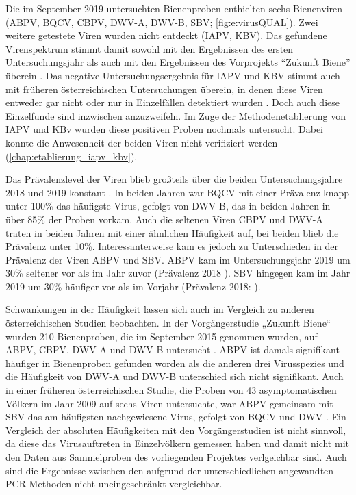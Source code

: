 Die im September 2019 untersuchten Bienenproben enthielten sechs Bienenviren (ABPV, BQCV, CBPV, DWV-A, DWV-B, SBV; \cref{fig:e:virusQUAL}). Zwei weitere getestete Viren wurden nicht entdeckt (IAPV, KBV). Das gefundene Virenspektrum stimmt damit sowohl mit den Ergebnissen des ersten Untersuchungsjahr als auch mit den Ergebnissen des Vorprojekts \enquote{Zukunft Biene} überein \citep{brodschneider2018b,brodschneider2019b}. Das negative Untersuchungsergebnis für IAPV und KBV stimmt auch mit früheren österreichischen Untersuchungen überein, in denen diese Viren entweder gar nicht oder nur in Einzelfällen detektiert wurden \citep{köglberger2009,girsch2012,moosbeckhofer2014}. Doch auch diese Einzelfunde sind inzwischen anzuzweifeln. Im Zuge der Methodenetablierung von IAPV und KBv wurden diese positiven Proben nochmals untersucht. Dabei konnte die Anwesenheit der beiden Viren nicht verifiziert werden (\cref{chap:etablierung_iapv_kbv}).

Das Prävalenzlevel der Viren blieb großteils über die beiden Untersuchungsjahre 2018 und 2019 konstant \citep{brodschneider2019b,morawetz2019a}. In beiden Jahren war BQCV mit einer Prävalenz knapp unter 100\% das häufigste Virus, gefolgt von DWV-B, das in beiden Jahren in über 85\% der Proben vorkam. Auch die seltenen Viren CBPV und DWV-A traten in beiden Jahren mit einer ähnlichen Häufigkeit auf, bei beiden blieb die Prävalenz unter 10\%. Interessanterweise kam es jedoch zu Unterschieden in der Prävalenz der Viren ABPV und SBV. ABPV kam im Untersuchungsjahr 2019 um 30\% seltener vor als im Jahr zuvor (Prävalenz 2018 ). SBV hingegen kam im Jahr 2019 um 30\% häufiger vor als im Vorjahr (Prävalenz 2018: ).

Schwankungen in der Häufigkeit lassen sich auch im Vergleich zu anderen österreichischen Studien beobachten. In der Vorgängerstudie „Zukunft Biene“ wurden 210 Bienenproben, die im September 2015 genommen wurden, auf ABPV, CBPV, DWV-A und DWV-B untersucht \citep{morawetz2018}. ABPV ist damals signifikant häufiger in Bienenproben gefunden worden als die anderen drei Virusspezies und die Häufigkeit von DWV-A und DWV-B unterschied sich nicht signifikant. Auch in einer früheren österreichischen Studie, die Proben von 43 asymptomatischen Völkern im Jahr 2009 auf sechs Viren untersuchte, war ABPV gemeinsam mit SBV das am häufigsten nachgewiesene Virus, gefolgt von BQCV und DWV \citep{köglberger2009}.  Ein Vergleich der absoluten Häufigkeiten mit den Vorgängerstudien ist nicht sinnvoll, da diese das Virusauftreten in Einzelvölkern gemessen haben und damit nicht mit den Daten aus Sammelproben des vorliegenden Projektes verlgeichbar sind.  Auch sind die Ergebnisse zwischen den aufgrund der unterschiedlichen angewandten PCR-Methoden nicht uneingeschränkt vergleichbar.


